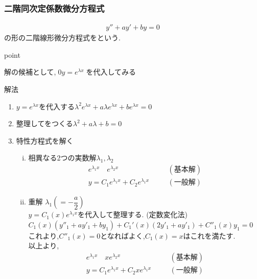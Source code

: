 \documentclass[a4paper]{jsarticle}
\begin{document}
\subsubsection{二階同次定係数微分方程式}
\begin{eqnarray*}
    y''+ay'+by=0
\end{eqnarray*}
の形の二階線形微分方程式をという.
\begin{itembox}[l]{point}
    \begin{center}
        解の候補として,$\;0y=e^{\lambda x}\;$を代入してみる
    \end{center}
\end{itembox}
\begin{itembox}[l]{解法}
    \begin{enumerate}[(1)]
        \item $y=e^{\lambda x}$を代入する\quad$\lambda^2 e^{\lambda x}+a\lambda e^{\lambda x}+b e^{\lambda x}=0$
        \item 整理してをつくる\quad$\lambda^2+a\lambda+b=0$
        \item 特性方程式を解く
              \begin{enumerate}[(i)]
                  \item 相異なる2つの実数解$\lambda_1,\lambda_2$
                        \begin{eqnarray*}
                            e^{\lambda_1x}\quad e^{\lambda_2x}\quad &&(基本解)\\
                            y=C_1 e^{\lambda_1x}+C_2e^{\lambda_1x}\quad &&(一般解)
                        \end{eqnarray*}
                  \item 重解 $\lambda_1\left(=-\dfrac{a}{2}\right)$\\
                        $y=C_1\left(x\right) e^{\lambda_1x}$を代入して整理する. (定数変化法)\\
                        $C_1\left(x\right)\left(y''_1+ay'_1+by_1\right)+C_1'\left(x\right)\left(2y'_1+ay'_1\right)+C''_1\left(x\right)y_1=0$\\
                        これより,$C''_1\left(x\right)=0$となればよく,$C_1\left(x\right)=x$はこれを満たす.\\
                        以上より,
                        \begin{eqnarray*}
                            e^{\lambda_1x}\quad xe^{\lambda_2x}\quad &&(基本解)\\
                            y=C_1 e^{\lambda_1x}+C_2xe^{\lambda_1x}\quad &&(一般解)

\end{eqnarray*}
\end{enumerate}
\end{enumerate}
\end{itembox}
\end{document}
